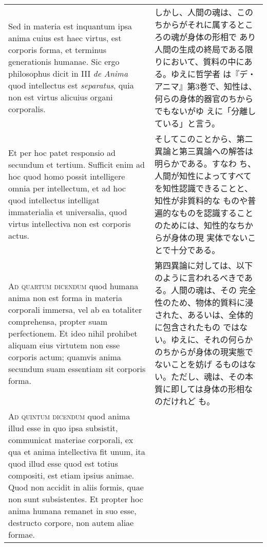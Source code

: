 \documentclass[paper=a4paper,fontsize=10pt,jafontsize=9pt,titlepage]{jlreq}
\begin{document}
\begin{longtable}{p{21em}p{21em}}
 \\

 Sed in materia
 est inquantum ipsa anima cuius est haec virtus, est corporis forma,
 et terminus generationis humanae. Sic ergo philosophus dicit in III
 {\itshape de Anima} quod intellectus est {\itshape separatus}, quia non est
 virtus alicuius organi corporalis.
 
&

 しかし、人間の魂は、このちからがそれに属するところの魂が身体の形相で
 あり人間の生成の終局である限りにおいて、質料の中にある。ゆえに哲学者
 は『デ・アニマ』第3巻で、知性は、何らの身体的器官のちからでもないがゆ
 えに「分離している」と言う。
  
\\

 Et per hoc patet responsio ad secundum et tertium. Sufficit enim ad
 hoc quod homo possit intelligere omnia per intellectum, et ad hoc
 quod intellectus intelligat immaterialia et universalia, quod virtus
 intellectiva non est corporis actus.

 
&

 そしてこのことから、第二異論と第三異論への解答は明らかである。すなわ
 ち、人間が知性によってすべてを知性認識できることと、知性が非質料的な
 ものや普遍的なものを認識することのためには、知性的なちからが身体の現
 実体でないことで十分である。
 
\\


{\scshape Ad quartum dicendum} quod humana anima non est forma in
materia corporali immersa, vel ab ea totaliter comprehensa, propter
suam perfectionem. Et ideo nihil prohibet aliquam eius virtutem non
esse corporis actum; quamvis anima secundum suam essentiam sit
corporis forma.
 
&

 第四異論に対しては、以下のように言われるべきである。人間の魂は、その
 完全性のため、物体的質料に浸された、あるいは、全体的に包含されたもの
 ではない。ゆえに、それの何らかのちからが身体の現実態でないことを妨げ
 るものはない。ただし、魂は、その本質に即しては身体の形相なのだけれど
 も。

 
\\




{\scshape Ad quintum dicendum} quod anima illud esse in quo ipsa subsistit,
 communicat materiae corporali, ex qua et anima intellectiva fit unum,
 ita quod illud esse quod est totius compositi, est etiam ipsius
 animae. Quod non accidit in aliis formis, quae non sunt
 subsistentes. Et propter hoc anima humana remanet in suo esse,
 destructo corpore, non autem aliae formae.
 

\end{longtable}
\end{document}
